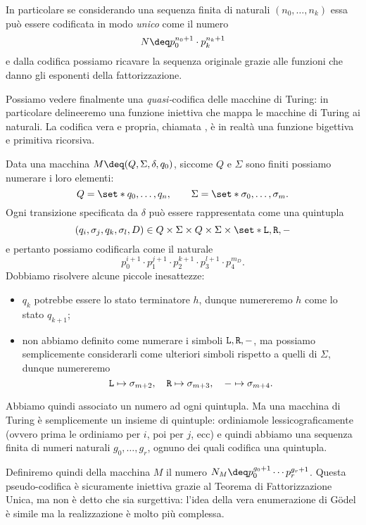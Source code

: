 In particolare se considerando una sequenza finita di naturali $(n_0, \dots, n_k)$ essa può essere codificata in modo \emph{unico} come il numero \[
    N \deq p_0^{n_0 + 1} \cdot p_k^{n_k+1}
\] e dalla codifica possiamo ricavare la sequenza originale grazie alle funzioni che danno gli esponenti della fattorizzazione.

Possiamo vedere finalmente una \emph{quasi-}codifica delle macchine di Turing: in particolare delineeremo una funzione iniettiva che mappa le macchine di Turing ai naturali. La codifica vera e propria, chiamata , è in realtà una funzione bigettiva e primitiva ricorsiva.

Data una macchina $M \deq (Q, \Sigma, \delta, q_0)$, siccome $Q$ e $\Sigma$ sono finiti possiamo numerare i loro elementi: \[
    Q = \set*{q_0, \dots, q_n}, \qquad \Sigma = \set*{\sigma_0, \dots, \sigma_m}.
\] Ogni transizione specificata da $\delta$ può essere rappresentata come una quintupla \[
    (q_i, \sigma_j, q_k, \sigma_l, D) \in Q \times \Sigma \times Q \times \Sigma \times \set*{\Left, \Right, \blank}
\] e pertanto possiamo codificarla come il naturale \[
    p_0^{i+1} \cdot p_1^{j+1} \cdot p_2^{k+1} \cdot p_3^{l+1} \cdot p_4^{m_D}.
\] Dobbiamo risolvere alcune piccole inesattezze: \begin{itemize}
    \item $q_k$ potrebbe essere lo stato terminatore $h$, dunque numereremo $h$ come lo stato $q_{k+1}$;
    \item non abbiamo definito come numerare i simboli $\texttt{L}, \texttt{R}, {-}$, ma possiamo semplicemente considerarli come ulteriori simboli rispetto a quelli di $\Sigma$, dunque numereremo \[
        \texttt{L} \mapsto \sigma_{m+2}, \quad \texttt{R} \mapsto \sigma_{m+3}, \quad {-} \mapsto \sigma_{m+4}.
    \]       
\end{itemize}

Abbiamo quindi associato un numero ad ogni quintupla. Ma una macchina di Turing è semplicemente un insieme di quintuple: ordiniamole lessicograficamente (ovvero prima le ordiniamo per $i$, poi per $j$, ecc) e quindi abbiamo una sequenza finita di numeri naturali $g_0, \dots, g_r$, ognuno dei quali codifica una quintupla. 

Definiremo quindi  della macchina $M$ il numero $N_M \deq p_0^{g_0+1} \cdots p_r^{g_r + 1}$. Questa pseudo-codifica è sicuramente iniettiva grazie al Teorema di Fattorizzazione Unica, ma non è detto che sia surgettiva: l'idea della vera enumerazione di G\"odel è simile ma la realizzazione è molto più complessa.

